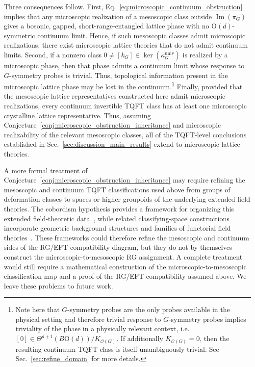 \documentclass[aps,prx,reprint,superscriptaddress,twocolumn,amsmath,amssymb,amsfonts, nofootinbib]{revtex4-2}
\theoremstyle{apsstyle}
\begin{document}
\noindent Three consequences follow. First, Eq.~\eqref{eq:microscopic_continuum_obstruction} implies that any microscopic realization of a mesoscopic class outside $\operatorname{Im}(\pi_G)$ gives a bosonic, gapped, short-range-entangled lattice phase with no $\mathrm{O}(d)$-symmetric continuum limit. Hence, if such mesoscopic classes admit microscopic realizations, there exist microscopic lattice theories that do not admit continuum limits. Second, if a nonzero class $0\neq[k_G]\in\ker(\kappa_G^{\mathrm{univ}})$
is realized by a microscopic phase, then that phase admits a continuum limit whose response to $G$-symmetry probes is trivial. Thus, topological information present in the microscopic lattice phase may be lost in the continuum.\footnote{Note here that $G$-symmetry probes are the only probes available in the physical setting and therefore trivial response to $G$-symmetry probes implies triviality of the phase in a physically relevant context, i.e. $[0]\in \Theta^{d+1}(B\mathrm{O}(d))/K_{\mathcal{O}(G)}$. If additionally $K_{\mathcal O(G)}=0$, then the resulting continuum TQFT class is itself unambiguously trivial. See Sec.~\ref{sec:refine_domain} for more details.} Finally, provided that the mesoscopic lattice representatives constructed here admit microscopic realizations, every continuum invertible TQFT class has at least one microscopic crystalline lattice representative. Thus, assuming Conjecture~\ref{conj:microscopic_obstruction_inheritance} and microscopic realizability of the relevant mesoscopic classes, all of the TQFT-level conclusions established in Sec.~\ref{sec:discussion_main_results} extend to microscopic lattice theories.


\bigskip 

A more formal treatment of Conjecture~\ref{conj:microscopic_obstruction_inheritance} may require refining the mesoscopic and continuum TQFT classifications used above from groups of deformation classes to spaces or higher groupoids of the underlying extended field theories. The cobordism hypothesis provides a framework for organizing this extended field-theoretic data~\cite{Baez1995,Lurie,FreedCobordism,SchommerPries2017}, while related classifying-space constructions incorporate geometric background structures and families of functorial field theories~\cite{MTW2010,GradyPavlov2022}. These frameworks could therefore refine the mesoscopic and continuum sides of the RG/EFT-compatibility diagram, but they do not by themselves construct the microscopic-to-mesoscopic RG assignment. 
A complete treatment would still require a mathematical construction of the microscopic-to-mesoscopic classification map and a proof of the RG/EFT compatibility assumed above. We leave these problems to future work.
\end{document}
